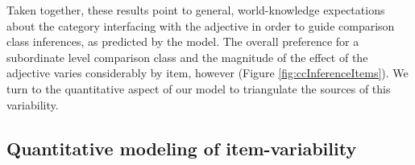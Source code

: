 \documentclass[doc, floatsintext]{apa6}
\begin{document}
Taken together, these results point to general, world-knowledge expectations about the category interfacing with the adjective in order to guide comparison class inferences, as predicted by the model.
The overall preference for a subordinate level comparison class and the magnitude of the effect of the adjective varies considerably by item, however (Figure \ref{fig:ccInferenceItems}).
We turn to the quantitative aspect of our model to triangulate the sources of this variability.

\subsection{Quantitative modeling of item-variability}

\end{document}
